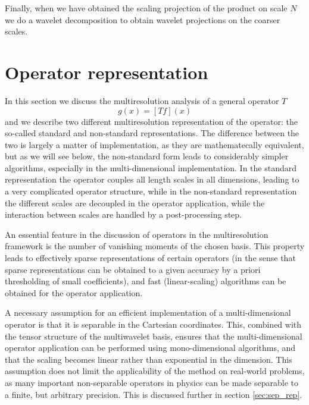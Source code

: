 Finally, when we have obtained the scaling projection of the product on scale
$N$ we do a wavelet decomposition to obtain wavelet projections on 
the coarser scales. 

\section{Operator representation}
In this section we discuss the multiresolution analysis of a general operator $T$
\begin{equation}
    g(x) = [Tf](x)
\end{equation}
and we describe two different multiresolution representation of the operator: the 
so-called standard and non-standard representations. The difference between 
the two is largely a matter of implementation, as they are mathematecally equivalent,
but as we will see below, the non-standard form leads to considerably simpler algorithms, 
especially in the multi-dimensional implementation. In the standard representation the
operator couples all length scales in all dimensions, leading to a very complicated
operator structure, while in the non-standard representation the different scales are 
decoupled in the operator application, while the interaction between scales are handled 
by a post-processing step.

An essential feature in the discussion of operators in the multiresolution framework
is the number of vanishing moments of the chosen basis. This property leads to 
effectively sparse representations of certain operators (in the sense that sparse
representations can be obtained to a given accuracy by a priori thresholding of small 
coefficients), and fast (linear-scaling) algorithms can be obtained for the operator 
application.

A necessary assumption for an efficient implementation of a multi-dimensional operator
is that it is separable in the Cartesian coordinates. This, combined with the tensor
structure of the multiwavelet basis, ensures that the multi-dimensional operator 
application can be performed using mono-dimensional algorithms, and that the scaling
becomes linear rather than exponential in the dimension. This assumption does not
limit the applicability of the method on real-world problems, as many important 
non-separable operators in physics can be made separable to a finite, but arbitrary
precision. This is discussed further in section \ref{sec:sep_rep}.

